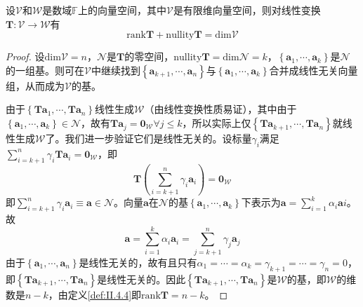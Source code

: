 \documentclass[main.tex]{subfiles}
\begin{document}
\begin{theorem}\label{thm:II.4.7}
设$\mathcal{V}$和$\mathcal{W}$是数域$\mathbb{F}$上的向量空间，其中$\mathcal{V}$是有限维向量空间，则对线性变换$\mathbf{T}:\mathcal{V}\rightarrow\mathcal{W}$有
\[
\mathrm{rank}\mathbf{T}+\mathrm{nullity}\mathbf{T}=\mathrm{dim}\mathcal{V}
\]
\end{theorem}
\begin{proof}
设$\mathrm{dim}\mathcal{V}=n$，$\mathcal{N}$是$\mathbf{T}$的零空间，$\mathrm{nullity}\mathbf{T}=\mathrm{dim}\mathcal{N}=k$，$\left\{\mathbf{a}_1,\cdots,\mathbf{a}_k\right\}$是$\mathcal{N}$的一组基。则可在$\mathcal{V}$中继续找到$\left\{\mathbf{a}_{k+1},\cdots,\mathbf{a}_{n}\right\}$与$\left\{\mathbf{a}_1,\cdots,\mathbf{a}_k\right\}$合并成线性无关向量组，从而成为$\mathcal{V}$的基。

由于$\left\{\mathbf{Ta}_1,\cdots,\mathbf{Ta}_n\right\}$线性生成$\mathcal{W}$（由线性变换性质易证），其中由于$\left\{\mathbf{a}_1,\cdots,\mathbf{a}_k\right\}\in\mathcal{N}$，故有$\mathbf{Ta}_j=\mathbf{0}_\mathcal{W}\forall j\leq k$，所以实际上仅$\left\{\mathbf{Ta}_{k+1},\cdots,\mathbf{Ta}_n\right\}$就线性生成$\mathcal{W}$了。我们进一步验证它们是线性无关的。设标量$\gamma_i$满足$\sum_{i=k+1}^n\gamma_i\mathbf{Ta}_i=\mathbf{0}_\mathcal{W}$，即
\[\mathbf{T}\left(\sum_{i=k+1}^n\gamma_i\mathbf{a}_i\right)=\mathbf{0}_\mathcal{W}\]
即$\sum_{i=k+1}^n\gamma_i\mathbf{a}_i\equiv\mathbf{a}\in\mathcal{N}$。向量$\mathbf{a}$在$\mathcal{N}$的基$\left\{\mathbf{a}_1,\cdots,\mathbf{a}_k\right\}$下表示为$\mathbf{a}=\sum_{i=1}^k\alpha_i\mathbf{a}i$。故
\[
\mathbf{a}=\sum_{i=1}^k\alpha_i\mathbf{a}_i=\sum_{j=k+1}^n\gamma_j\mathbf{a}_j
\]
由于$\left\{\mathbf{a}_1,\cdots,\mathbf{a}_n\right\}$是线性无关的，故有且只有$\alpha_1=\cdots=\alpha_k=\gamma_{k+1}=\cdots=\gamma_n=0$，即$\left\{\mathbf{Ta}_{k+1},\cdots,\mathbf{Ta}_n\right\}$是线性无关的。因此$\left\{\mathbf{Ta}_{k+1},\cdots,\mathbf{Ta}_n\right\}$是$\mathcal{W}$的基，即$\mathcal{W}$的维数是$n-k$，由定义\ref{def:II.4.4}即$\mathrm{rank}\mathbf{T}=n-k$。
\end{proof}
\end{document}
